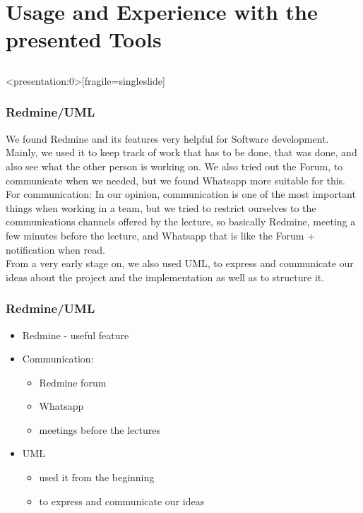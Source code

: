 \section{Usage and Experience with the presented Tools} \subsection{}

\begin{frame}<presentation:0>[fragile=singleslide]
	\frametitle{Redmine/UML}
	We found Redmine and its features very helpful for Software development. Mainly, we used it to keep track of work that has to be done, that was done, and also see what the other person is working on. We also tried out the Forum, to communicate when we needed, but we found Whatsapp more suitable for this.\\
	For communication: In our opinion, communication is one of the most important things when working in a team, but we tried to restrict ourselves to the communications channels offered by the lecture, so basically Redmine, meeting a few minutes before the lecture, and Whatsapp that is like the Forum + notification when read.\\
	From a very early stage on, we also used UML, to express and communicate our ideas about the project and the implementation as well as to structure it.
  \end{frame}


\begin{frame}[fragile=singleslide]
	\frametitle{Redmine/UML}
	\begin{itemize}
		\item Redmine - useful feature
		\item Communication:
			\begin{itemize}
				\item Redmine forum 
				\item Whatsapp
				\item meetings before the lectures
			\end{itemize}
		\item UML
		\begin{itemize}
				\item used it from the beginning
				\item to express and communicate our ideas
			\end{itemize}
	\end{itemize}
  \end{frame}
	
